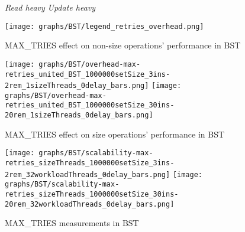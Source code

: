 \documentclass{article}
\begin{document}
\begin{figure*}[htbp]
	\centering
	\medskip
	\textit{Read heavy}\hspace{10cm}
	\textit{Update heavy}\par
        \medskip
    \texttt{[image: graphs/BST/legend\_retries\_overhead.png]}\par\vspace{0.5em}
MAX\_TRIES effect on non-size operations' performance in BST\par
        \medskip
	\texttt{[image: graphs/BST/overhead-max-retries\_united\_BST\_1000000setSize\_3ins-2rem\_1sizeThreads\_0delay\_bars.png]}\hspace{2.5em}
	\texttt{[image: graphs/BST/overhead-max-retries\_united\_BST\_1000000setSize\_30ins-20rem\_1sizeThreads\_0delay\_bars.png]}\vspace{-1.2em}

        \vspace{1.2em}
	MAX\_TRIES effect on size operations' performance in BST\par
        \medskip
	\texttt{[image: graphs/BST/scalability-max-retries\_sizeThreads\_1000000setSize\_3ins-2rem\_32workloadThreads\_0delay\_bars.png]}\hspace{2.5em}
	\texttt{[image: graphs/BST/scalability-max-retries\_sizeThreads\_1000000setSize\_30ins-20rem\_32workloadThreads\_0delay\_bars.png]}\vspace{-1.2em}
	\caption{MAX\_TRIES measurements in BST}
	\label{fig:MAX_TRIES BST}
\end{figure*}
\end{document}
